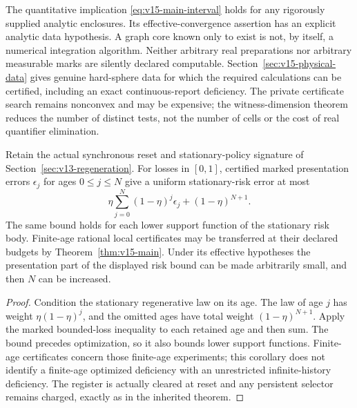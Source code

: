 \begin{remark}
The quantitative implication \eqref{eq:v15-main-interval} holds for
any rigorously supplied analytic enclosures. Its effective-convergence
assertion has an explicit analytic data hypothesis. A graph core known
only to exist is not, by itself, a numerical integration algorithm.
Neither arbitrary real preparations nor arbitrary measurable marks
are silently declared computable. Section~\ref{sec:v15-physical-data}
gives genuine hard-sphere data for which the required calculations can
be certified, including an exact continuous-report deficiency.
The private certificate search remains nonconvex and may be expensive;
the witness-dimension theorem reduces the number of distinct tests,
not the number of cells or the cost of real quantifier elimination.
\end{remark}

\begin{corollary}
\label{cor:v15-regenerative}
Retain the actual synchronous reset and stationary-policy signature of
Section~\ref{sec:v13-regeneration}. For losses in $[0,1]$, certified
marked presentation errors $\epsilon_j$ for ages $0\le j\le N$ give
a uniform stationary-risk error at most
\[
 \eta\sum_{j=0}^N(1-\eta)^j\epsilon_j+(1-\eta)^{N+1}.
\]
The same bound holds for each lower support function of the stationary
risk body. Finite-age rational local certificates may be transferred
at their declared budgets by Theorem~\ref{thm:v15-main}. Under its
effective hypotheses the presentation part of the displayed risk
bound can be made arbitrarily small, and then $N$ can be increased.
\end{corollary}
\begin{proof}
Condition the stationary regenerative law on its age. The law of age
$j$ has weight $\eta(1-\eta)^j$, and the omitted ages have total weight
$(1-\eta)^{N+1}$. Apply the marked bounded-loss inequality to each
retained age and then sum. The bound precedes optimization, so it also
bounds lower support functions. Finite-age certificates concern those
finite-age experiments; this corollary does not identify a finite-age
optimized deficiency with an unrestricted infinite-history deficiency.
The register is actually cleared at reset and any persistent selector
remains charged, exactly as in the inherited theorem.
\end{proof}
